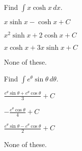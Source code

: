 \documentclass[12pt]{exam}
\newcommand{\<}{(}
\renewcommand{\>}{)}
\begin{document}
\begin{center}
\end{center}
\vspace{0.1in}

\vspace{12pt}

\begin{questions}\setcounter{question}{4}

\question
Find \(\int x\cosh x\,dx\).
\begin{choices}
\item \(x\sinh x-\cosh x+C\)
\item \(x^2\sinh x+2\cosh x+C\)
\item \(x\cosh x+3x\sinh x+C\)
\item None of these.
\end{choices}


\question
Find \(\int e^\theta\sin\theta\,d\theta\).
\begin{choices}
\item \(\displaystyle\frac{e^\theta\sin\theta+e^\theta\cos\theta}{3}+C\)
\item \(\displaystyle-\frac{e^\theta\cos\theta}{4}+C\)
\item \(\displaystyle\frac{e^\theta\sin\theta-e^\theta\cos\theta}{2}+C\)
\item None of these.
\end{choices}



\end{questions}
\end{document}

